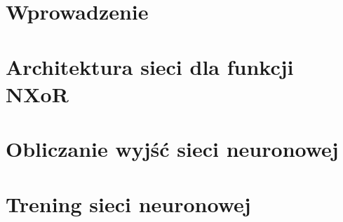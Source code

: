  



\maketitle
\tableofcontents{}
\newpage


\section{Wprowadzenie}
 

\section{Architektura sieci dla funkcji NXoR}
 


\section{Obliczanie wyjść sieci neuronowej}
 

%  


\section{Trening sieci neuronowej}
 




